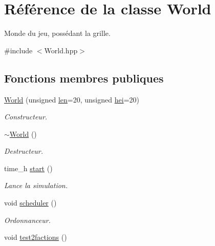 \hypertarget{classWorld}{\section{Référence de la classe World}
\label{classWorld}
}


Monde du jeu, possédant la grille.  




{\ttfamily \#include $<$World.\-hpp$>$}

\subsection*{Fonctions membres publiques}
\begin{DoxyCompactItemize}
\item 
\hyperlink{classWorld_ac6dabb39d0af2594d84dde35ec79c585}{World} (unsigned \hyperlink{classWorld_a9263bc299d1446cc7435c58fc70dbc12}{len}=20, unsigned \hyperlink{classWorld_abb70914eb0c8c9a083372c679b512a84}{hei}=20)
\begin{DoxyCompactList}\small\item\em Constructeur. \end{DoxyCompactList}\item 
\hypertarget{classWorld_a8c73fba541a5817fff65147ba47cd827}{\hyperlink{classWorld_a8c73fba541a5817fff65147ba47cd827}{$\sim$\-World} ()}\label{classWorld_a8c73fba541a5817fff65147ba47cd827}

\begin{DoxyCompactList}\small\item\em Destructeur. \end{DoxyCompactList}\item 
time\-\_\-h \hyperlink{classWorld_a6d23268873d3e6dc117d6c76fc87626b}{start} ()
\begin{DoxyCompactList}\small\item\em Lance la simulation. \end{DoxyCompactList}\item 
void \hyperlink{classWorld_a26aa2658c22414b5f572df8cb5efbeae}{scheduler} ()
\begin{DoxyCompactList}\small\item\em Ordonnanceur. \end{DoxyCompactList}\item 
\hypertarget{classWorld_af50a03db2f7a2fea3a013557251d5a7c}{void \hyperlink{classWorld_af50a03db2f7a2fea3a013557251d5a7c}{test2factions} ()}\label{classWorld_af50a03db2f7a2fea3a013557251d5a7c}


\end{DoxyCompactItemize}
